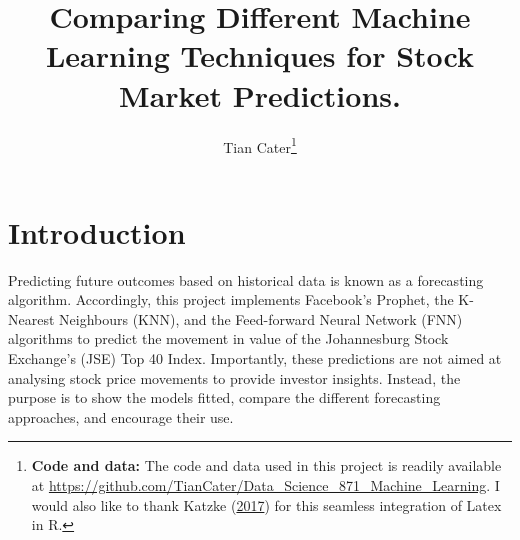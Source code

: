 \documentclass[11pt,preprint, authoryear]{elsarticle}
\numberwithin{equation}{section}
\numberwithin{figure}{section}
\numberwithin{table}{section}
\let\rmarkdownfootnote\footnote%
\def\footnote{\protect\rmarkdownfootnote}
\begin{document}
\begin{frontmatter}  %

\title{Comparing Different Machine Learning Techniques for Stock Market
Predictions.}





\author[Add1]{Tian Cater\footnote{\textbf{Code and data:} \newline The
  code and data used in this project is readily available at
  \url{https://github.com/TianCater/Data_Science_871_Machine_Learning}.
  I would also like to thank Katzke
  (\protect\hyperlink{ref-Texevier}{2017}) for this seamless integration
  of Latex in R.}}





\address[Add1]{Data Science 871: Machine Learning Project}



\vspace{1cm}





\vspace{0.5cm}

\end{frontmatter}



\pagestyle{fancy}
\chead{}
\rhead{}
\lfoot{}
\lhead{}
\cfoot{}


\headsep 35pt %




\hypertarget{introduction}{%
\section{\texorpdfstring{Introduction
\label{Introduction}}{Introduction }}\label{introduction}}

Predicting future outcomes based on historical data is known as a
forecasting algorithm. Accordingly, this project implements Facebook's
Prophet, the K-Nearest Neighbours (KNN), and the Feed-forward Neural
Network (FNN) algorithms to predict the movement in value of the
Johannesburg Stock Exchange's (JSE) Top 40 Index. Importantly, these
predictions are not aimed at analysing stock price movements to provide
investor insights. Instead, the purpose is to show the models fitted,
compare the different forecasting approaches, and encourage their use.
\end{document}
